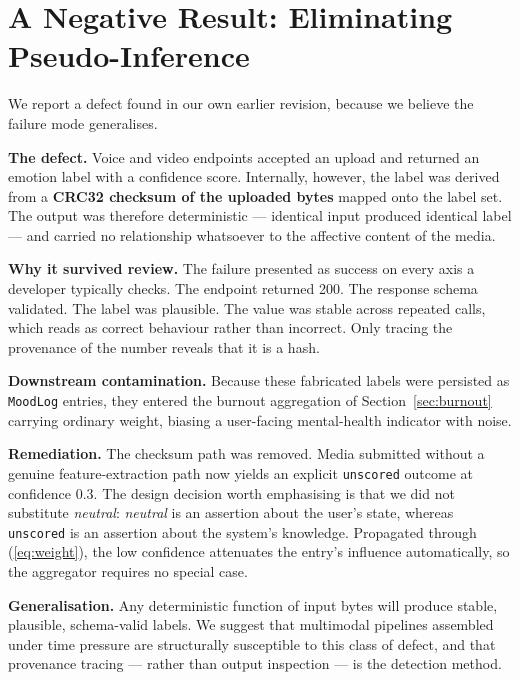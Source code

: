 \documentclass[conference]{IEEEtran}
\begin{document}
\section{A Negative Result: Eliminating Pseudo-Inference}
\label{sec:negative}

We report a defect found in our own earlier revision, because we believe the
failure mode generalises.

\textbf{The defect.} Voice and video endpoints accepted an upload and returned
an emotion label with a confidence score. Internally, however, the label was
derived from a \textbf{CRC32 checksum of the uploaded bytes} mapped onto the
label set. The output was therefore deterministic --- identical input produced
identical label --- and carried no relationship whatsoever to the affective
content of the media.

\textbf{Why it survived review.} The failure presented as success on every
axis a developer typically checks. The endpoint returned 200. The response
schema validated. The label was plausible. The value was stable across
repeated calls, which reads as correct behaviour rather than incorrect. Only
tracing the provenance of the number reveals that it is a hash.

\textbf{Downstream contamination.} Because these fabricated labels were
persisted as \texttt{MoodLog} entries, they entered the burnout aggregation of
Section~\ref{sec:burnout} carrying ordinary weight, biasing a user-facing
mental-health indicator with noise.

\textbf{Remediation.} The checksum path was removed. Media submitted without a
genuine feature-extraction path now yields an explicit \texttt{unscored}
outcome at confidence $0.3$. The design decision worth emphasising is that we
did not substitute \textit{neutral}: \textit{neutral} is an assertion about the
user's state, whereas \texttt{unscored} is an assertion about the system's
knowledge. Propagated through (\ref{eq:weight}), the low confidence attenuates
the entry's influence automatically, so the aggregator requires no special
case.

\textbf{Generalisation.} Any deterministic function of input bytes will
produce stable, plausible, schema-valid labels. We suggest that multimodal
pipelines assembled under time pressure are structurally susceptible to this
class of defect, and that provenance tracing --- rather than output
inspection --- is the detection method.
\end{document}
